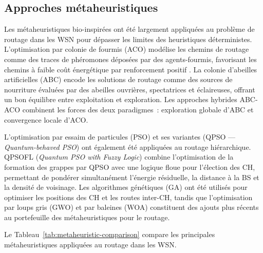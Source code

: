 \subsection{Approches métaheuristiques}

Les métaheuristiques bio-inspirées ont été largement appliquées au problème de routage dans les WSN pour dépasser les limites des heuristiques déterministes. L'optimisation par colonie de fourmis (ACO) modélise les chemins de routage comme des traces de phéromones déposées par des agents-fourmis, favorisant les chemins à faible coût énergétique par renforcement positif \cite{salama2016aco}. La colonie d'abeilles artificielles (ABC) \cite{karaboga2005abc} encode les solutions de routage comme des sources de nourriture évaluées par des abeilles ouvrières, spectatrices et éclaireuses, offrant un bon équilibre entre exploitation et exploration. Les approches hybrides ABC-ACO combinent les forces des deux paradigmes~: exploration globale d'ABC et convergence locale d'ACO.

L'optimisation par essaim de particules (PSO) \cite{kennedy1995pso} et ses variantes (QPSO --- \emph{Quantum-behaved PSO}) ont également été appliquées au routage hiérarchique. QPSOFL (\emph{Quantum PSO with Fuzzy Logic}) \cite{hu_energy_2024} combine l'optimisation de la formation des grappes par QPSO avec une logique floue pour l'élection des CH, permettant de pondérer simultanément l'énergie résiduelle, la distance à la BS et la densité de voisinage. Les algorithmes génétiques (GA) ont été utilisés pour optimiser les positions des CH et les routes inter-CH, tandis que l'optimisation par loups gris (GWO) \cite{mirjalili2014gwo} et par baleines (WOA) \cite{mirjalili2016woa} constituent des ajouts plus récents au portefeuille des métaheuristiques pour le routage.

Le Tableau~\ref{tab:metaheuristic-comparison} compare les principales métaheuristiques appliquées au routage dans les WSN.

